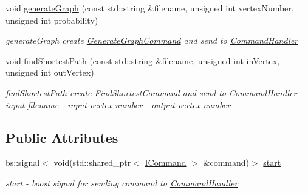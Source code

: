 \begin{DoxyCompactItemize}
void \hyperlink{a00009_a163bf285dbd0fc8e66aaba2cd09342ca_a163bf285dbd0fc8e66aaba2cd09342ca}{generate\+Graph} (const std\+::string \&filename, unsigned int vertex\+Number, unsigned int probability)
\begin{DoxyCompactList}\small\item\em generate\+Graph create \hyperlink{a00006}{Generate\+Graph\+Command} and send to \hyperlink{a00003}{Command\+Handler} \end{DoxyCompactList}\item 
void \hyperlink{a00009_a72677b42fdf6246c51faad0985b3a8b3_a72677b42fdf6246c51faad0985b3a8b3}{find\+Shortest\+Path} (const std\+::string \&filename, unsigned int in\+Vertex, unsigned int out\+Vertex)
\begin{DoxyCompactList}\small\item\em find\+Shortest\+Path create Find\+Shortest\+Command and send to \hyperlink{a00003}{Command\+Handler}  -\/ input filename  -\/ input vertex number  -\/ output vertex number \end{DoxyCompactList}\end{DoxyCompactItemize}
\subsection*{Public Attributes}
\begin{DoxyCompactItemize}
\item 
bs\+::signal$<$ void(std\+::shared\+\_\+ptr$<$ \hyperlink{a00008}{I\+Command} $>$ \&command)$>$ \hyperlink{a00009_a9586c0c0672e02050699b4c95fd78169_a9586c0c0672e02050699b4c95fd78169}{start}
\begin{DoxyCompactList}\small\item\em start -\/ boost signal for sending command to \hyperlink{a00003}{Command\+Handler} \end{DoxyCompactList}\end{DoxyCompactItemize}
